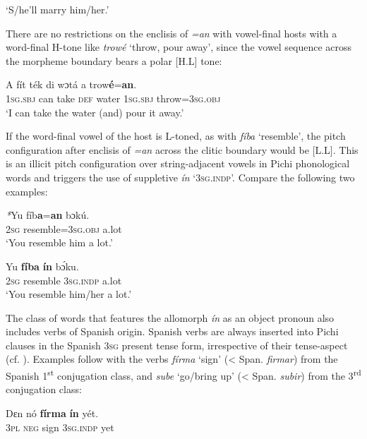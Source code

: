 \glt ‘S/he’ll marry him/her.’ 
\z

There are no restrictions on the enclisis of \textit{=an} with vowel-final hosts with a word-final H-tone like \textit{trowé} ‘throw, pour away’, since the vowel sequence across the morpheme boundary bears a polar [H.L] tone:


\ea%
    \label{ex:key:67}
    \gll   A    fít  ték    di  wɔtá  a    trow\textbf{é}=\textbf{an}.\\
\textsc{1sg.sbj}  can  take    \textsc{def}  water  \textsc{1sg.sbj}  throw=\textsc{3sg.obj}\\

\glt ‘I can take the water (and) pour it away.’ 
\z

If the word-final vowel of the host is L-toned, as with \textit{fíba} ‘resemble’, the pitch configuration after enclisis of \textit{=an} across the clitic boundary would be [L.L]. This is an illicit pitch configuration over string-adjacent vowels in Pichi phonological words and triggers the use of suppletive \textit{ín} ‘\textsc{3sg.indp’.} Compare the following two examples:


\ea%
    \label{ex:key:68}
    \gll   \textit{*}Yu    fíb\textbf{a}=\textbf{an}    bɔkú.\\
\textsc{2sg}  resemble=\textsc{3sg.obj}  a.lot\\

\glt  ‘You resemble him a lot.’ 
\z


\ea%
    \label{ex:key:69}
    \gll   Yu  \textbf{fíba}      \textbf{ín}    bɔ́ku.\\
\textsc{2sg}  resemble    \textsc{3sg.indp}  a.lot\\

\glt ‘You resemble him/her a lot.’ 
\z

The class of words that features the allomorph \textit{ín} as an object pronoun also includes verbs of Spanish origin. Spanish verbs are always inserted into Pichi clauses in the Spanish \textsc{3sg} present tense form, irrespective of their tense-aspect (cf. ). Examples follow with the verbs \textit{fírma} ‘sign’ (< Span. \textit{firmar}) from the Spanish 1\textsuperscript{st} conjugation class, and \textit{sube} ‘go/bring up’ (< Span. \textit{subir}) from the 3\textsuperscript{rd} conjugation class:


\ea%
    \label{ex:key:70}
    \gll   Dɛn    nó    \textbf{fírma}  \textbf{ín}    yét.    \\
\textsc{3pl}    \textsc{neg}    sign    \textsc{3sg.indp}  yet\\


